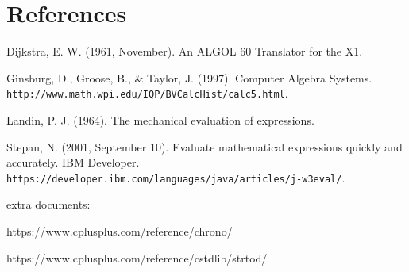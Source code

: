 \documentclass[11pt]{article}
\begin{document}
\section*{References}
Dijkstra, E. W. (1961, November). An ALGOL 60 Translator for the X1.

Ginsburg, D., Groose, B., \& Taylor, J. (1997). Computer Algebra Systems.\\ \texttt{http://www.math.wpi.edu/IQP/BVCalcHist/calc5.html}.

Landin, P. J. (1964). The mechanical evaluation of expressions.

Stepan, N. (2001, September 10). Evaluate mathematical expressions quickly and accurately. IBM Developer.\\ \texttt{https://developer.ibm.com/languages/java/articles/j-w3eval/}.

extra documents:

https://www.cplusplus.com/reference/chrono/

https://www.cplusplus.com/reference/cstdlib/strtod/
\end{document}
